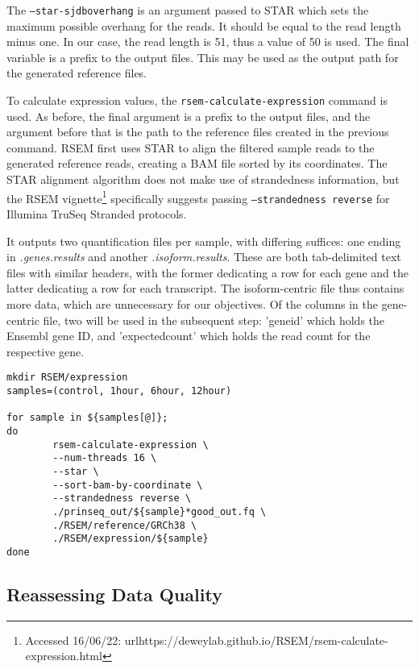 The \texttt{--star-sjdboverhang} is an argument passed to \ac{STAR} which sets the maximum possible overhang for the reads. It should be equal to the read length minus one. In our case, the read length is 51, thus a value of 50 is used. The final variable is a prefix to the output files. This may be used as the output path for the generated reference files.

To calculate expression values, the \texttt{rsem-calculate-expression} command is used. As before, the final argument is a prefix to the output files, and the argument before that is the path to the reference files created in the previous command. RSEM first uses \ac{STAR} to align the filtered sample reads to the generated reference reads, creating a BAM file sorted by its coordinates. The STAR alignment algorithm does not make use of strandedness information, but the RSEM vignette\footnote{Accessed 16/06/22: url{https://deweylab.github.io/RSEM/rsem-calculate-expression.html}} specifically suggests passing \texttt{--strandedness reverse} for Illumina TruSeq Stranded protocols.

It outputs two quantification files per sample, with differing suffices: one ending in \textit{.genes.results} and another \textit{.isoform.results}. These are both tab-delimited text files with similar headers, with the former dedicating a row for each gene and the latter dedicating a row for each transcript. The isoform-centric file thus contains more data, which are unnecessary for our objectives. Of the columns in the gene-centric file, two will be used in the subsequent step: 'gene\textunderscore id' which holds the Ensembl gene ID, and 'expected\textunderscore count' which holds the read count for the respective gene. %



\begin{lstlisting}[caption=RSEM expression command, label={lst:RSEM_exp}]
mkdir RSEM/expression
samples=(control, 1hour, 6hour, 12hour)

for sample in ${samples[@]};
do
        rsem-calculate-expression \
        --num-threads 16 \
        --star \
        --sort-bam-by-coordinate \
        --strandedness reverse \
        ./prinseq_out/${sample}*good_out.fq \
        ./RSEM/reference/GRCh38 \
        ./RSEM/expression/${sample}
done
\end{lstlisting}

\subsection{Reassessing Data Quality}

